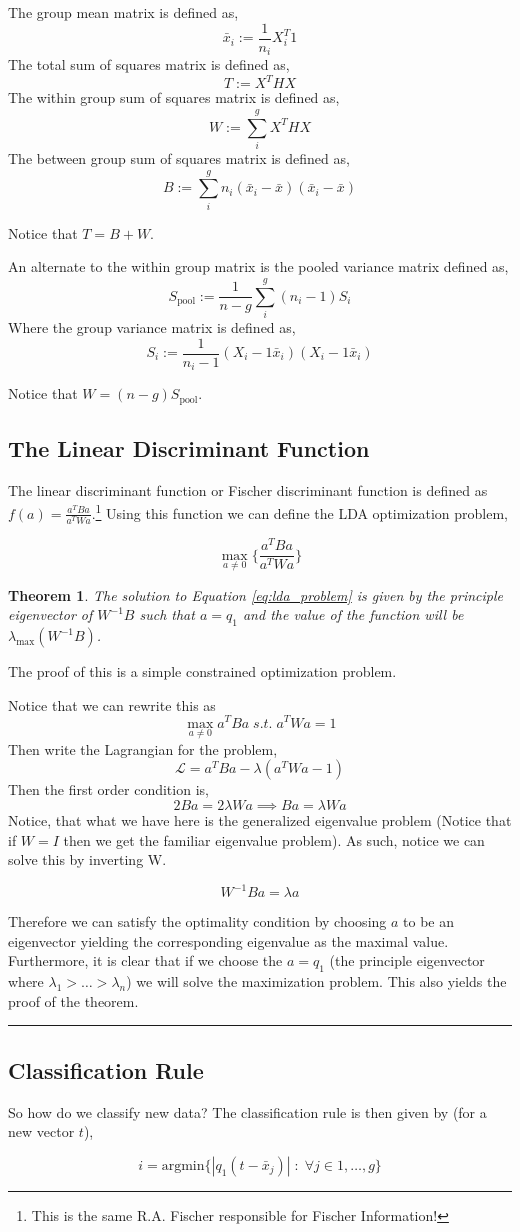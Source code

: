 \documentclass[twoside]{article}
\newtheorem{theorem}{Theorem}[section]
\newenvironment{proof}{{\bf Proof:}}{\hfill\rule{2mm}{2mm}}
\begin{document}
The group mean matrix is defined as, $$\bar{x}_i := \frac{1}{n_i}X_i^T1$$
The total sum of squares matrix is defined as, $$T := X^THX$$
The within group sum of squares matrix is defined as, $$W:=\sum_i^g X^THX$$
The between group sum of squares matrix is defined as,$$B:=\sum_i^g n_i(\bar{x}_i-\bar{x})(\bar{x}_i-\bar{x})$$

Notice that $T = B + W$.

An alternate to the within group matrix is the pooled variance matrix defined as,
$$S_{\text{pool}} := \frac{1}{n-g}\sum_i^g(n_i-1)S_i$$
Where the group variance matrix is defined as,
$$S_i := \frac{1}{n_i-1}(X_i - 1\bar{x}_i)(X_i - 1\bar{x}_i)$$

Notice that $W = (n-g)S_{\text{pool}}$.

\subsection{The Linear Discriminant Function}

The linear discriminant function or Fischer discriminant function is defined as $f(a) = \frac{a^TBa}{a^TWa}$.\footnote{This is the same R.A. Fischer responsible for Fischer Information!} Using this function we can define the LDA optimization problem,

\begin{equation}\max_{a\neq0}\{\frac{a^TBa}{a^TWa}\}\label{eq:lda_problem}\end{equation}

\begin{theorem} The solution to Equation \ref{eq:lda_problem} is given by the principle eigenvector of $W^{-1}B$ such that $a = q_1$ and the value of the function will be $\lambda_{\max}(W^{-1}B)$.
\end{theorem}

\begin{proof} The proof of this is a simple constrained optimization problem.

Notice that we can rewrite this as $$\max_{a\neq0} a^TBa \;s.t.\; a^TWa = 1$$
Then write the Lagrangian for the problem,
$$\mathcal{L} = a^TBa - \lambda(a^TWa - 1)$$
Then the first order condition is,
$$2Ba = 2\lambda Wa \implies Ba = \lambda Wa$$
Notice, that what we have here is the generalized eigenvalue problem (Notice that if $W = I$ then we get the familiar eigenvalue problem). As such, notice we can solve this by inverting W.

$$W^{-1}Ba = \lambda a$$

Therefore we can satisfy the optimality condition by choosing $a$ to be an eigenvector yielding the corresponding eigenvalue as the maximal value. Furthermore, it is clear that if we choose the $a = q_1$ (the principle eigenvector where $\lambda_1>\dots>\lambda_n$) we will solve the maximization problem. This also yields the proof of the theorem. 

\end{proof}

\subsection{Classification Rule}

So how do we classify new data? The classification rule is then given by (for a new vector $t$),

$$i = \text{argmin}\{|q_1(t-\bar{x}_j)|\;:\;\forall j \in 1,\dots,g\}$$


\end{document}
